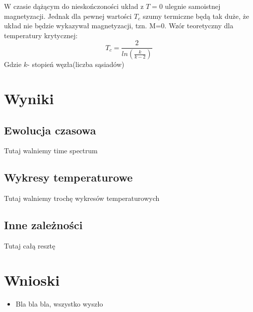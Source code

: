 \documentclass[12pt,a4paper]{article}
\begin{document}
W czasie dążącym do nieskończoności układ z $T=0$ ulegnie samoistnej magnetyzacji. Jednak dla pewnej wartości $T_c$ szumy termiczne będą tak duże, że układ nie będzie wykazywał magnetyzacji, tzn. M=0. Wzór teoretyczny dla temperatury krytycznej:
$$ T_{c}=\frac{2}{ln(\frac{k}{k-2})} $$
Gdzie $k$- stopień węzła(liczba sąsiadów)

\section{Wyniki}
\subsection{Ewolucja czasowa}
Tutaj walniemy time spectrum
\subsection{Wykresy temperaturowe}
Tutaj walniemy trochę wykresów temperaturowych
\subsection{Inne zależności}
Tutaj całą resztę

\section{Wnioski}
\begin{itemize}
\item Bla bla bla, wszystko wyszło
\end{itemize}
\end{document}
